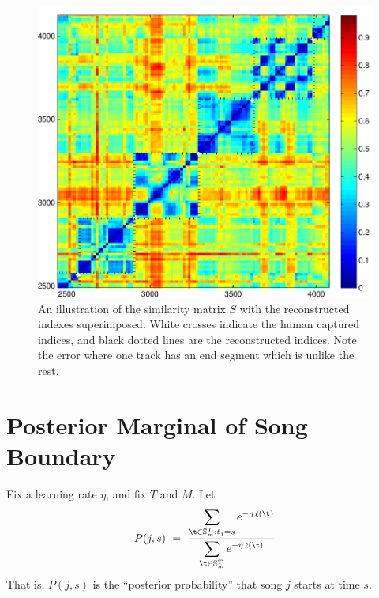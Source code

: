 \documentclass[twocolumn]{article}
\DeclareMathOperator{\loss}{\ell}
\newcommand{\segs}{\mathbb S}
\begin{document}
	\begin{figure}[t]
		\centering
		\includegraphics[width=\textwidth]{images/simmat_preds}
		
		\caption{An illustration of the similarity matrix $S$ with the reconstructed indexes superimposed. White crosses indicate the human captured indices, and black dotted lines are the reconstructed indices. Note the error where one track has an end segment which is unlike the rest. }
		\label{fig:predictions}
	\end{figure} 
	
	
	
	
	\section{Posterior Marginal of Song Boundary}
	Fix a learning rate $\eta$, and fix $T$ and $M$. Let
	\[
	P(j,s) ~=~ 
	\frac{\displaystyle
		\sum_{\t \in \segs^T_m : t_j = s} e^{- \eta \loss(\t)}
	}{\displaystyle
	\sum_{\t \in \segs^T_m} e^{- \eta \loss(\t)}
}
\]
That is, $P(j,s)$ is the ``posterior probability'' that song $j$ starts at time $s$.
\end{document}
